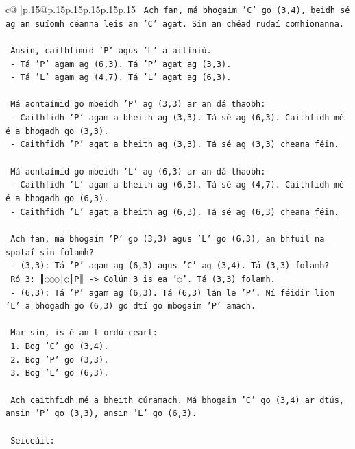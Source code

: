 \documentclass{article}
\begin{document}
{\begin{supertabular}{c@{$\;$}|p{.15\linewidth}@{}p{.15\linewidth}p{.15\linewidth}p{.15\linewidth}p{.15\linewidth}p{.15\linewidth}}
{{{\texttt{   Ach fan, má bhogaim 'C' go (3,4), beidh sé ag an suíomh céanna leis an 'C' agat. Sin an chéad rudaí comhionanna.} \\
\\ 
\texttt{   Ansin, caithfimid 'P' agus 'L' a ailíniú.} \\
\texttt{   {-} Tá 'P' agam ag (6,3). Tá 'P' agat ag (3,3).} \\
\texttt{   {-} Tá 'L' agam ag (4,7). Tá 'L' agat ag (6,3).} \\
\\ 
\texttt{   Má aontaímid go mbeidh 'P' ag (3,3) ar an dá thaobh:} \\
\texttt{   {-} Caithfidh 'P' agam a bheith ag (3,3). Tá sé ag (6,3). Caithfidh mé é a bhogadh go (3,3).} \\
\texttt{   {-} Caithfidh 'P' agat a bheith ag (3,3). Tá sé ag (3,3) cheana féin.} \\
\\ 
\texttt{   Má aontaímid go mbeidh 'L' ag (6,3) ar an dá thaobh:} \\
\texttt{   {-} Caithfidh 'L' agam a bheith ag (6,3). Tá sé ag (4,7). Caithfidh mé é a bhogadh go (6,3).} \\
\texttt{   {-} Caithfidh 'L' agat a bheith ag (6,3). Tá sé ag (6,3) cheana féin.} \\
\\ 
\texttt{   Ach fan, má bhogaim 'P' go (3,3) agus 'L' go (6,3), an bhfuil na spotaí sin folamh?} \\
\texttt{   {-} (3,3): Tá 'P' agam ag (6,3) agus 'C' ag (3,4). Tá (3,3) folamh?} \\
\texttt{     Ró 3: ║◌◌◌│◌│P║ {-}> Colún 3 is ea '◌'. Tá (3,3) folamh.} \\
\texttt{   {-} (6,3): Tá 'P' agam ag (6,3). Tá (6,3) lán le 'P'. Ní féidir liom 'L' a bhogadh go (6,3) go dtí go mbogaim 'P' amach.} \\
\\ 
\texttt{   Mar sin, is é an t{-}ordú ceart:} \\
\texttt{   1. Bog 'C' go (3,4).} \\
\texttt{   2. Bog 'P' go (3,3).} \\
\texttt{   3. Bog 'L' go (6,3).} \\
\\ 
\texttt{   Ach caithfidh mé a bheith cúramach. Má bhogaim 'C' go (3,4) ar dtús, ansin 'P' go (3,3), ansin 'L' go (6,3).} \\
\\ 
\texttt{   Seiceáil:} \\
}}}
\end{supertabular}}
\end{document}
